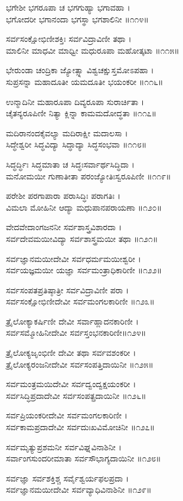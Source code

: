 ಭಗೇಶೀ ಭಗರೂಪಾ ಚ ಭಗಗುಹ್ಯಾ ಭಗಾವಹಾ ।\\
ಭಗೋದರೀ ಭಗಾನಂದಾ ಭಗಸ್ಥಾ ಭಗಶಾಲಿನೀ ॥೧೧೪॥

ಸರ್ವಸಂಕ್ಷೋಭಿಣೀಶಕ್ತಿಃ ಸರ್ವವಿದ್ರಾವಿಣೀ ತಥಾ ।\\
ಮಾಲಿನೀ ಮಾಧವೀ ಮಾಧ್ವೀ ಮಧುರೂಪಾ ಮಹೋತ್ಕಟಾ ॥೧೧೫॥

ಭೇರುಂಡಾ ಚಂದ್ರಿಕಾ ಜ್ಯೋತ್ಸ್ನಾ ವಿಶ್ವಚಕ್ಷುಸ್ತಮೋಽಪಹಾ ।\\
ಸುಪ್ರಸನ್ನಾ ಮಹಾದೂತೀ ಯಮದೂತೀ ಭಯಂಕರೀ ॥೧೧೬॥

ಉನ್ಮಾದಿನೀ ಮಹಾರೂಪಾ ದಿವ್ಯರೂಪಾ ಸುರಾರ್ಚಿತಾ ।\\
ಚೈತನ್ಯರೂಪಿಣೀ ನಿತ್ಯಾ ಕ್ಲಿನ್ನಾ ಕಾಮಮದೋದ್ಧತಾ ॥೧೧೭॥

ಮದಿರಾನಂದಕೈವಲ್ಯಾ ಮದಿರಾಕ್ಷೀ ಮದಾಲಸಾ ।\\
ಸಿದ್ಧೇಶ್ವರೀ ಸಿದ್ಧವಿದ್ಯಾ ಸಿದ್ಧಾದ್ಯಾ ಸಿದ್ಧಸಂಭವಾ ॥೧೧೮॥

ಸಿದ್ಧರ್ದ್ಧಿಃ ಸಿದ್ಧಮಾತಾ ಚ ಸಿದ್ಧಃಸರ್ವಾರ್ಥಸಿದ್ಧಿದಾ ।\\
ಮನೋಮಯೀ ಗುಣಾತೀತಾ ಪರಂಜ್ಯೋತಿಃಸ್ವರೂಪಿಣೀ ॥೧೧೯॥

ಪರೇಶೀ ಪರಗಾಪಾರಾ ಪರಾಸಿದ್ಧಿಃ ಪರಾಗತಿಃ ।\\
ವಿಮಲಾ ಮೋಹಿನೀ ಆದ್ಯಾ ಮಧುಪಾನಪರಾಯಣಾ ॥೧೨೦॥

ವೇದವೇದಾಂಗಜನನೀ ಸರ್ವಶಾಸ್ತ್ರವಿಶಾರದಾ ।\\
ಸರ್ವದೇವಮಯೀವಿದ್ಯಾ ಸರ್ವಶಾಸ್ತ್ರಮಯೀ ತಥಾ ॥೧೨೧॥

ಸರ್ವಜ್ಞಾನಮಯೀದೇವೀ ಸರ್ವಧರ್ಮಮಯೀಶ್ವರೀ ।\\
ಸರ್ವಯಜ್ಞಮಯೀ ಯಜ್ಞಾ ಸರ್ವಮಂತ್ರಾಧಿಕಾರಿಣೀ ॥೧೨೨॥

ಸರ್ವಸಂಪತಪ್ರತಿಷ್ಠಾತ್ರೀ ಸರ್ವವಿದ್ರಾವಿಣೀ ಪರಾ ।\\
ಸರ್ವಸಂಕ್ಷೋಭಿಣೀದೇವೀ ಸರ್ವಮಂಗಲಕಾರಿಣೀ ॥೧೨೩॥

ತ್ರೈಲೋಕ್ಯಾಕರ್ಷಿಣೀ ದೇವೀ ಸರ್ವಾಹ್ಲಾದನಕಾರಿಣೀ ।\\
ಸರ್ವಸಮ್ಮೋಹಿನೀದೇವೀ ಸರ್ವಸ್ತಂಭನಕಾರಿಣೀ॥೧೨೪॥

ತ್ರೈಲೋಕ್ಯಜೃಂಭಿಣೀ ದೇವೀ ತಥಾ ಸರ್ವವಶಂಕರೀ ।\\
ತ್ರೈಲೋಕ್ಯರಂಜನೀದೇವೀ ಸರ್ವಸಂಪತ್ತಿದಾಯಿನೀ ॥೧೨೫॥

ಸರ್ವಮಂತ್ರಮಯಿದೇವೀ ಸರ್ವದ್ವಂದ್ವಕ್ಷಯಂಕರೀ ।\\
ಸರ್ವಸಿದ್ಧಿಪ್ರದಾದೇವೀ ಸರ್ವಸಂಪತ್ಪ್ರದಾಯಿನೀ ॥೧೨೬॥

ಸರ್ವಪ್ರಿಯಂಕರೀದೇವೀ ಸರ್ವಮಂಗಲಕಾರಿಣೀ ।\\
ಸರ್ವಕಾಮಪ್ರದಾದೇವೀ ಸರ್ವದುಃಖವಿಮೋಚಿನೀ ॥೧೨೭॥

ಸರ್ವಮೃತ್ಯುಪ್ರಶಮನೀ ಸರ್ವವಿಘ್ನವಿನಾಶಿನೀ ।\\
ಸರ್ವಾಂಗಸುಂದರೀಮಾತಾ ಸರ್ವಸೌಭಾಗ್ಯದಾಯಿನೀ ॥೧೨೮॥

ಸರ್ವಜ್ಞಾ ಸರ್ವಶಕ್ತಿಶ್ಚ ಸರ್ವೈಶ್ವರ್ಯಫಲಪ್ರದಾ ।\\
ಸರ್ವಜ್ಞಾನಮಯೀದೇವೀ ಸರ್ವವ್ಯಾಧಿವಿನಾಶಿನೀ ॥೧೨೯॥

